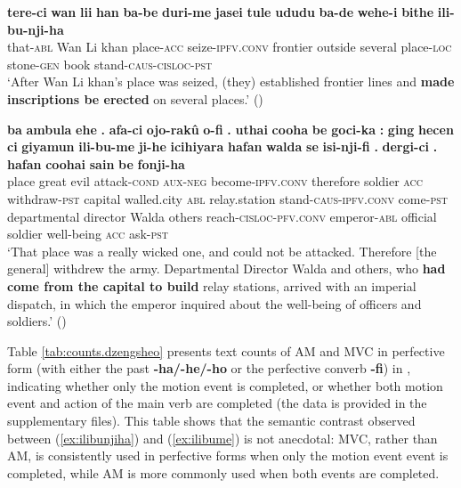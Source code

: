 \documentclass{article}
\newcommand{\ipa}[1]{\textbf{{\phon\mbox{#1}}}} %
\begin{document}
\begin{exe}
\ex \label{ex:ilibunjiha}
\gll
\ipa{tere-ci} 	\ipa{wan} 	\ipa{lii} 	\ipa{han} 	\ipa{ba-be} 	\ipa{duri-me} 	\ipa{jasei} 	\ipa{tule} 	\ipa{ududu} 	\ipa{ba-de} 	\ipa{wehe-i} 	\ipa{bithe} 	\ipa{ili-bu-nji-ha} \\
that-\textsc{abl} Wan Li khan place-\textsc{acc} seize-\textsc{ipfv.conv} frontier outside several place-\textsc{loc} stone-\textsc{gen} book stand-\textsc{caus-cisloc-pst} \\
\glt ‘After Wan Li khan’s place was seized, (they) established frontier lines and \textbf{made inscriptions be erected} on several places.’ (\citealt[129-130;46]{shunjuu92yargiyan})
\end{exe}

\begin{exe}
\ex \label{ex:ilibume}
\gll
\ipa{ba} 	\ipa{ambula} 	\ipa{ehe} 	\ipa{.} 	\ipa{afa-ci} 	\ipa{ojo-rakû} 	\ipa{o-fi} 	\ipa{.} 	\ipa{uthai} 	\ipa{cooha} 	\ipa{be} 	\ipa{goci-ka} 	\ipa{:} 	\ipa{ging} 	\ipa{hecen} 	\ipa{ci} 	\ipa{giyamun} 	\ipa{ili-bu-me} 	\ipa{ji-he} 	\ipa{icihiyara} 	\ipa{hafan} 	\ipa{walda} 	\ipa{se} 	\ipa{isi-nji-fi} 	\ipa{.} 	\ipa{dergi-ci} 	\ipa{.} 	\ipa{hafan} 	\ipa{coohai} 	\ipa{sain} 	\ipa{be} 	\ipa{fonji-ha} \\
place great evil { } attack-\textsc{cond} \textsc{aux-neg} become-\textsc{ipfv.conv} { } therefore soldier \textsc{acc} withdraw-\textsc{pst} { } capital walled.city \textsc{abl} relay.station stand-\textsc{caus-ipfv.conv} come-\textsc{pst} departmental director Walda others reach-\textsc{cisloc-pfv.conv} { } emperor-\textsc{abl} { } official soldier well-being \textsc{acc} ask-\textsc{pst} \\
\glt `That place was a really wicked one, and could not be attacked. Therefore [the general] withdrew the army. Departmental Director Walda and others, who \textbf{had come from the capital to build} relay stations, arrived with an imperial dispatch, in which the emperor inquired about the well-being of officers and soldiers.' (\citealt[94/62]{cosmo06dzengseo})
\end{exe}

Table \ref{tab:counts.dzengsheo} presents text counts of AM and MVC in perfective form (with either the past \ipa{-ha/-he/-ho} or the perfective converb \ipa{-fi}) in \citet{cosmo06dzengseo}, indicating whether only the motion event is completed, or whether both motion event and action of the main verb are completed (the data is provided in the supplementary files). This table shows that the semantic contrast observed between (\ref{ex:ilibunjiha}) and (\ref{ex:ilibume}) is not anecdotal: MVC, rather than AM,  is consistently used in perfective forms when only the motion event event is completed, while AM is more commonly used when both events are completed.
\end{document}
